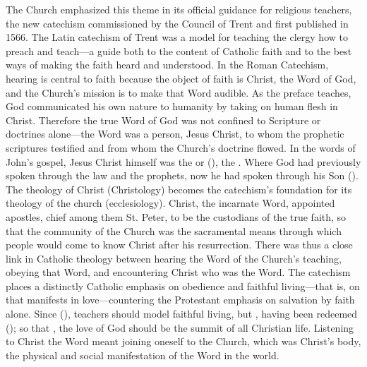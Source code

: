 The Church emphasized this theme in its official guidance for religious
teachers, the new catechism  commissioned by the
Council of Trent and first published in 1566.%
    \Autocites
    {Catholic:Catechismus1614} %
    []{NewCatholic}
The Latin catechism of Trent was a model for teaching the clergy how to preach
and teach---a guide both to the content of Catholic faith and to the best ways
of making the faith heard and understood.%
    \Autocite[]{NewCatholic}
In the Roman Catechism, hearing is central to faith because the object of faith
is Christ, the Word of God, and the Church's mission is to make that Word
audible.
As the preface teaches, God communicated his own nature to humanity by taking on
human flesh in Christ.
Therefore the true Word of God was not confined to Scripture or doctrines
alone---the Word was a person, Jesus Christ, to whom the prophetic scriptures
testified and from whom the Church's doctrine flowed.%
    \Autocite[9]{Catholic:Catechismus1614}
In the words of John's gospel, Jesus Christ himself was the  or
 (), the .
Where God had previously spoken through the law and the prophets, now he had
spoken through his Son ().
The theology of Christ (Christology) becomes the catechism's foundation for its
theology of the church (ecclesiology).
Christ, the incarnate Word, appointed apostles, chief among them St. Peter, to
be the custodians of the true faith, so that the community of the Church  was
the sacramental means through which people would come to know Christ after his
resurrection.
There was thus a close link in Catholic theology between hearing the Word of the
Church's teaching, obeying that Word, and encountering Christ who was the Word.
The catechism places a distinctly Catholic emphasis on obedience and faithful
living---that is, on  that manifests in love---countering
the Protestant emphasis on salvation by faith alone.
Since 
(), teachers should model faithful living,  but , having been redeemed 
(); so that , the love of God should be the summit of all Christian
life.%
    \Autocite[6--7]{Catholic:Catechismus1614}
Listening to Christ the Word meant joining oneself to the Church, which was
Christ's body, the physical and social manifestation of the Word in the world.

